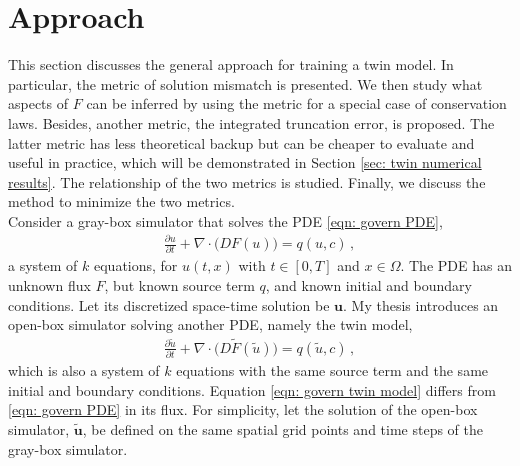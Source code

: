 \section{Approach}
\label{infer}
This section discusses the general approach for training a twin model.
In particular, the metric of solution mismatch is presented. 
We then study what aspects of $F$ can be 
inferred by using the metric for a special case of conservation laws.
Besides, another metric, the integrated truncation error, is proposed.
The latter metric has less theoretical backup but can be cheaper to evaluate and
useful in practice, which
will be demonstrated in Section \ref{sec: twin numerical results}.
The relationship of the two metrics is studied. Finally, we discuss the method
to minimize the two metrics.\\

Consider a gray-box simulator that solves the PDE \eqref{eqn: govern PDE}, 
\begin{equation*}\begin{split}
    \frac{\partial u}{\partial t}+ \nabla \cdot \big( D F(u) \big) = q(u,c)\,,
\end{split}
\end{equation*}
a system of $k$ equations, for $u(t,x)$ with $t\in[0,T]$
and $x\in\Omega$. The PDE has an unknown flux $F$, but known source term $q$, and
known initial and boundary conditions.
Let its discretized space-time solution be $\boldsymbol{u}$.
My thesis introduces an open-box simulator solving another PDE, namely the twin model,
\begin{equation}\begin{split}
    \frac{\partial \tilde{u}}{\partial t}+ \nabla \cdot \big(D \tilde{F}(\tilde{u})\big) = q(\tilde{u},c)\,,
\end{split}
\label{eqn: govern twin model}
\end{equation}
which is also a system of $k$ equations
with the same source term and the same initial and boundary conditions. 
Equation \eqref{eqn: govern twin model}
differs from \eqref{eqn: govern PDE} in its flux. 
For simplicity,
let the solution of the open-box simulator, $\tilde{\boldsymbol{u}}$, be defined on the same 
spatial grid points and time steps of the gray-box simulator. \\

